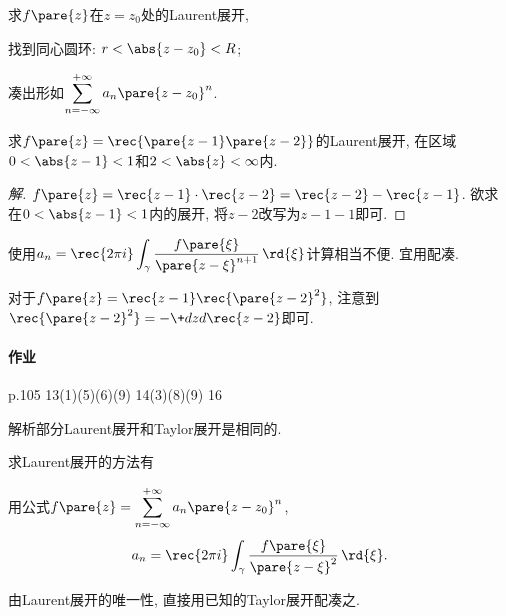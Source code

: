 \documentclass[../ComplexVariable.tex]{subfiles}
\begin{document}
\par
求$f\pare{z}$在$z=z_0$处的Laurent展开,
\begin{cenum}
    \item 找到同心圆环: $r<\abs{z-z_0}<R$;
    \item 凑出形如$\displaystyle \sum_{n=-\infty}^{+\infty} a_n\pare{z-z_0}^{n}$.
\end{cenum}
\begin{sample}
    \begin{ex}
        求$\displaystyle f\pare{z} = \rec{\pare{z-1}\pare{z-2}}$的Laurent展开, 在区域$0<\abs{z-1}<1$和$2<\abs{z}<\infty$内.
    \end{ex}
    \begin{proof}[解]
        $\displaystyle f\pare{z} = \rec{z-1}\cdot\rec{z-2} = \rec{z-2} - \rec{z-1}$. 欲求在$0 < \abs{z-1} < 1$内的展开, 将$z-2$改写为$z-1-1$即可.
    \end{proof}
    \begin{remark}
        使用$\displaystyle a_n = \rec{2\pi i} \int_\gamma \frac{f\pare{\xi}}{\pare{z-\xi}^{n+1}}\,\rd{\xi}$计算相当不便. 宜用配凑.
    \end{remark}
    \begin{remark}
        对于$\displaystyle f\pare{z} = \rec{z-1} \rec{\pare{z-2}^2}$, 注意到$\displaystyle \rec{\pare{z-2}^2} = -\+dzd{} \rec{z-2}$即可.
    \end{remark}
\end{sample}


\paragraph{作业} %
\label{par:作业}

p.105 13(1)(5)(6)(9) 14(3)(8)(9) 16


\begin{remark}
    解析部分Laurent展开和Taylor展开是相同的.
\end{remark}
求Laurent展开的方法有
\begin{cenum}
    \item 用公式$f\pare{z} = \displaystyle \sum_{n=-\infty}^{+\infty} a_n\pare{z-z_0}^n$,
    \[ a_n = \rec{2\pi i} \int_\gamma \frac{f\pare{\xi}}{\pare{z-\xi}^2}\,\rd{\xi}. \]
    \item 由Laurent展开的唯一性, 直接用已知的Taylor展开配凑之.
\end{cenum}

\end{document}

